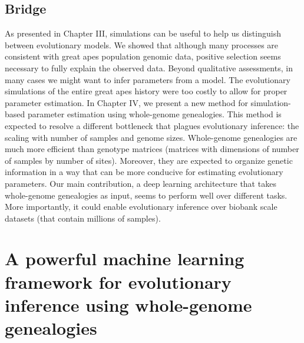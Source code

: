 \section{Bridge}
As presented in Chapter III, simulations can be useful to help us distinguish between evolutionary models.
We showed that although many processes are consistent with great apes population genomic data,
positive selection seems necessary to fully explain the observed data.
Beyond qualitative assessments, in many cases we might want to infer parameters from a model.
The evolutionary simulations of the entire great apes history were too costly to allow for proper parameter estimation.
In Chapter IV, we present a new method for simulation-based parameter estimation using whole-genome genealogies.
This method is expected to resolve a different bottleneck that plagues evolutionary inference: the scaling with number of samples and genome sizes.
Whole-genome genealogies are much more efficient than genotype matrices (matrices with dimensions of number of samples by number of sites).
Moreover, they are expected to organize genetic information in a way that can be more conducive for estimating evolutionary parameters.
Our main contribution, a deep learning architecture that takes whole-genome genealogies as input, seems to perform well over different tasks.
More importantly, it could enable evolutionary inference over biobank scale datasets (that contain millions of samples).

\chapter{A powerful machine learning framework for evolutionary inference using whole-genome genealogies} \label{chapter:tsnn}







